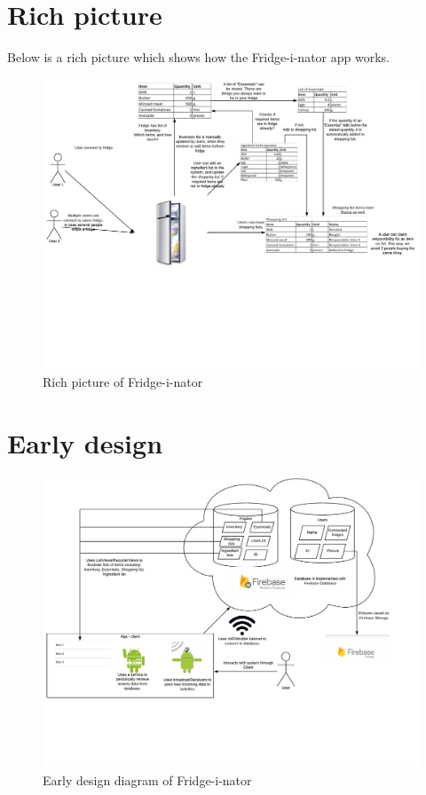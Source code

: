 \documentclass[12pt]{article}
\begin{document}
\section{Rich picture}
Below is a rich picture which shows how the Fridge-i-nator app works.

\begin{figure}[H]
	\centering
	\includegraphics[width=180mm]{Img/Fridge_rich_picture.pdf}
	\caption{Rich picture of Fridge-i-nator}
	\label{fig:RichPic}
\end{figure}

\section{Early design}

\begin{figure}[H]
	\centering
	\includegraphics[width=180mm]{Img/Fridge_some_diagram.pdf}
	\caption{Early design diagram of Fridge-i-nator}
	\label{fig:Design diagram}
\end{figure}
\end{document}
